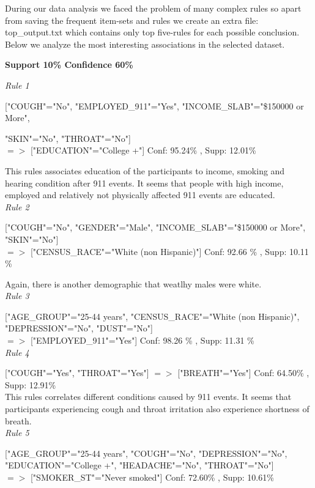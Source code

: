 \documentclass[11pt]{article}
\begin{document}
During our data analysis we faced the problem of many complex rules  so apart from saving the frequent item-sets and rules we create an extra file: top\_output.txt which contains only
top five-rules for each possible conclusion.  Below we analyze the most interesting associations in the selected dataset.

\textbf{Support 10\% Confidence 60\%}

\textit{Rule 1}

["COUGH"="No", "EMPLOYED\_911"="Yes", "INCOME\_SLAB"="\$150000 or More", 

"SKIN"="No", "THROAT"="No"] \\ 
$=>$ ["EDUCATION"="College +"] Conf: 95.24\% , Supp: 12.01\%  

This rules associates education of the participants to income, smoking and hearing condition after 911 events. It seems that people with high income, employed and
relatively not physically affected 911 events are educated. \\

\textit{Rule 2}

["COUGH"="No", "GENDER"="Male", "INCOME\_SLAB"="\$150000 or More", "SKIN"="No"] \\
$=>$ ["CENSUS\_RACE"="White (non Hispanic)"] Conf: 92.66 \% , Supp: 10.11 \% 

Again, there is another demographic that weatlhy males were white. \\

\textit{Rule 3}

["AGE\_GROUP"="25-44 years", "CENSUS\_RACE"="White (non Hispanic)", "DEPRESSION"="No", "DUST"="No"]\\
 $=>$ ["EMPLOYED\_911"="Yes"] Conf: 98.26 \% , Supp: 11.31 \%  \\

\textit{Rule 4}

["COUGH"="Yes", "THROAT"="Yes"] $=>$ ["BREATH"="Yes"] Conf: 64.50\% , Supp: 12.91\%  \\

This rules correlates different conditions caused by 911 events. It seems that participants experiencing cough and throat irritation also experience shortness of breath.\\

\textit{Rule 5}

["AGE\_GROUP"="25-44 years", "COUGH"="No", "DEPRESSION"="No", "EDUCATION"="College +", "HEADACHE"="No", "THROAT"="No"]\\
$=>$ ["SMOKER\_ST"="Never smoked"] Conf: 72.60\% , Supp: 10.61\%  \\
\end{document}
